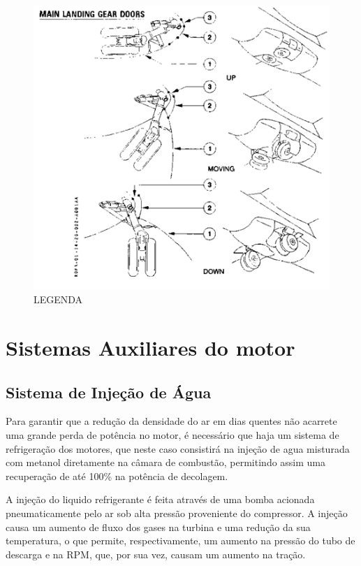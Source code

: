 \begin{figure}
\centering
\includegraphics{images/parte3/sistemas_trem_de_pouso.png}
\caption{LEGENDA}
\label{fig:sistemas_trem_de_pouso}
\end{figure}


\section{Sistemas Auxiliares do motor}

\subsection{Sistema de Injeção de Água}

Para garantir que a redução da densidade do ar em dias quentes não acarrete uma grande perda de potência no motor, é necessário que haja um sistema de refrigeração dos motores, que neste caso consistirá na injeção de agua misturada com metanol diretamente na câmara de combustão, permitindo assim uma recuperação de até 100\% na potência de decolagem.

A injeção do liquido refrigerante é feita através de uma bomba acionada pneumaticamente pelo ar sob alta pressão proveniente do compressor.
A injeção causa um aumento de fluxo dos gases na turbina e uma redução da sua temperatura, o que permite, respectivamente, um aumento na pressão do tubo de descarga e na RPM, que, por sua vez, causam um aumento na tração.

